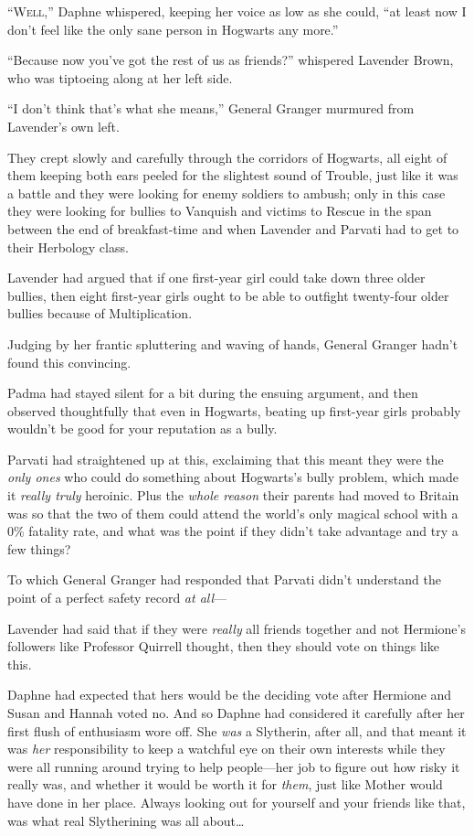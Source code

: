 
\lettrine{“W}{ell},” Daphne
whispered, keeping her voice as low as she could, “at least now I don’t feel
like the only sane person in Hogwarts any more.”

“Because now you’ve got the rest of us as friends?” whispered Lavender Brown,
who was tiptoeing along at her left side.

“I don’t think that’s what she means,” General Granger murmured from Lavender’s
own left.

They crept slowly and carefully through the corridors of Hogwarts, all eight of
them keeping both ears peeled for the slightest sound of Trouble, just like it
was a battle and they were looking for enemy soldiers to ambush; only in this
case they were looking for bullies to Vanquish and victims to Rescue in the
span between the end of breakfast-time and when Lavender and Parvati had to get
to their Herbology class.

Lavender had argued that if one first-year girl could take down three older
bullies, then eight first-year girls ought to be able to outfight twenty-four
older bullies because of Multiplication.

Judging by her frantic spluttering and waving of hands, General Granger hadn’t
found this convincing.

Padma had stayed silent for a bit during the ensuing argument, and then
observed thoughtfully that even in Hogwarts, beating up first-year girls
probably wouldn’t be good for your reputation as a bully.

Parvati had straightened up at this, exclaiming that this meant they were the
\emph{only ones} who could do something about Hogwarts’s bully problem, which
made it \emph{really truly} heroinic. Plus the \emph{whole reason} their
parents had moved to Britain was so that the two of them could attend the
world’s only magical school with a 0\% fatality rate, and what was the point if
they didn’t take advantage and try a few things?

To which General Granger had responded that Parvati didn’t understand the point
of a perfect safety record \emph{at all}—

Lavender had said that if they were \emph{really} all friends together and not
Hermione’s followers like Professor Quirrell thought, then they should vote on
things like this.

Daphne had expected that hers would be the deciding vote after Hermione and
Susan and Hannah voted no. And so Daphne had considered it carefully after her
first flush of enthusiasm wore off. She \emph{was} a Slytherin, after all, and
that meant it was \emph{her} responsibility to keep a watchful eye on their own
interests while they were all running around trying to help people—her job to
figure out how risky it really was, and whether it would be worth it for
\emph{them}, just like Mother would have done in her place. Always looking out
for yourself and your friends like that, was what real Slytherining was all
about…

